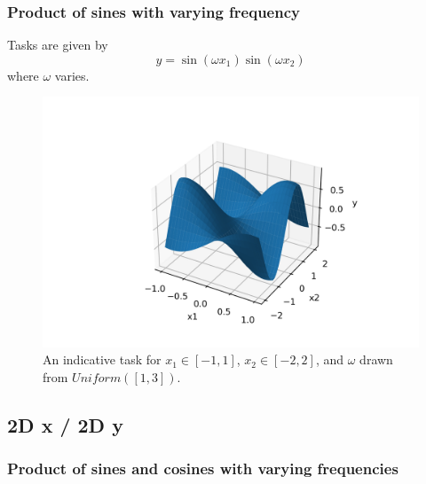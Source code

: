 \subsubsection{Product of sines with varying frequency}

Tasks are given by 
\begin{equation}
	y = \sin(\omega x_1) \sin(\omega x_2)
\end{equation}
where $\omega$ varies.
\begin{figure}[H]
	\centering
	\includegraphics[width=.7\linewidth]{./figs/sinusoidal_product_functions.png}  
	\caption{An indicative task for $x_1 \in [-1, 1]$, $x_2 \in [-2, 2]$, and $\omega$ drawn from $Uniform([1,3])$.}
	\label{}
\end{figure}

\subsection{2D x / 2D y}
\subsubsection{Product of sines and cosines with varying frequencies}


